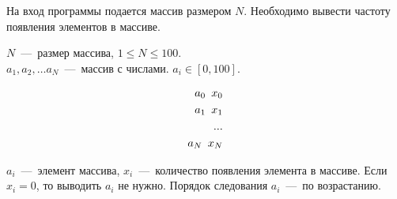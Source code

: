 На вход программы подается массив размером $N$. Необходимо вывести частоту появления элементов в массиве.
\InputFile

\noindent
$N$~---~размер массива, $1 \leq N \leq 100$. \\
$a_1, a_2, \ldots a_N$~---~массив с числами. $ a_i \in [0, 100]$. 

\OutputFile

\begin{align*}
	a_0 \enskip x_0 \\
	a_1 \enskip x_1 \\
	... \\
	a_N \enskip x_N \\
\end{align*}

$a_i$~---~элемент массива, $x_i$~---~количество появления элемента в массиве. 
Если $x_i = 0$, то выводить $a_i$ не нужно. Порядок следования $a_i$~---~по возрастанию.

\SAMPLES

